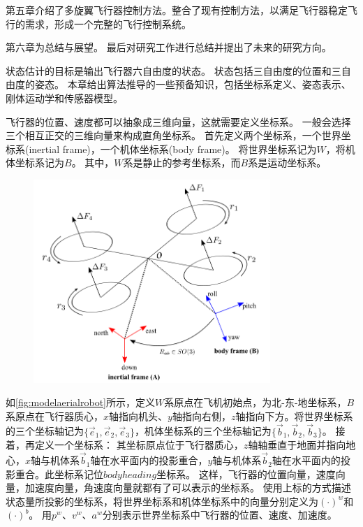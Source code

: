 \documentclass[
  type=master
]{gdutthesis}
\begin{document}
第五章介绍了多旋翼飞行器控制方法。整合了现有控制方法，以满足飞行器稳定飞行的需求，形成一个完整的飞行控制系统。

第六章为总结与展望。
最后对研究工作进行总结并提出了未来的研究方向。



状态估计的目标是输出飞行器六自由度的状态。
状态包括三自由度的位置和三自由度的姿态。
本章给出算法推导的一些预备知识，包括坐标系定义、姿态表示、刚体运动学和传感器模型。


飞行器的位置、速度都可以抽象成三维向量，这就需要定义坐标系。
一般会选择三个相互正交的三维向量来构成直角坐标系。
首先定义两个坐标系，一个世界坐标系(inertial frame)，一个机体坐标系(body frame)。
将世界坐标系记为$W$，将机体坐标系记为$B$。
其中，$W$系是静止的参考坐标系，而$B$系是运动坐标系。
\begin{figure}[htbp]
	\centering
	\includegraphics[width=0.8\textwidth]{屏幕截图 2022-03-31 222546.png}
	\label{fig:modelaerialrobot}
\end{figure}

如\autoref{fig:modelaerialrobot}所示，定义$W$系原点在飞机初始点，为北-东-地坐标系，$B$系原点在飞行器质心，$x$轴指向机头、$y$轴指向右侧，$z$轴指向下方。将世界坐标系的三个坐标轴记为$\big\{ \vec{e}_1,\vec{e}_2,\vec{e}_3 \big\}$，机体坐标系的三个坐标轴记为$\big\{ \vec{b}_1,\vec{b}_2,\vec{b}_3 \big\}$。
接着，再定义一个坐标系：
其坐标原点位于飞行器质心，$z$轴轴垂直于地面并指向地心，$x$轴与机体系$\vec{b}_1$轴在水平面内的投影重合，$y$轴与机体系$\vec{b}_2$轴在水平面内的投影重合。此坐标系记位$bodyheading$坐标系。
这样，飞行器的位置向量，速度向量，加速度向量，角速度向量就都有了可以表示的坐标系。
使用上标的方式描述状态量所投影的坐标系，将世界坐标系和机体坐标系中的向量分别定义为$(\cdot)^w$和$(\cdot)^b$。
用$p^w$、$v^w$、$a^w$分别表示世界坐标系中飞行器的位置、速度、加速度。
\end{document}
